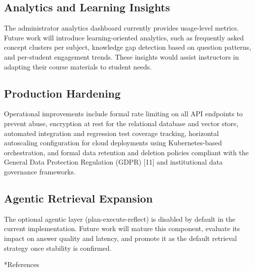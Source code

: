 \documentclass[12pt, a4paper, oneside]{report}
\makeatletter
\newcommand{\chapformat}[1]{%
  \centering
  {\fontsize{14}{17}\selectfont\itshape\addfontfeatures{LetterSpace=3.5}%
    \MakeUppercase{\chaptertitlename}\ \thechapter}\\[24pt]%
  {\fontsize{16}{19}\selectfont\bfseries\addfontfeatures{LetterSpace=0}%
    \MakeUppercase{#1}}%
}
\newcommand{\chapformatstar}[1]{%
  \centering
  {\fontsize{16}{19}\selectfont\bfseries\MakeUppercase{#1}}%
}
\newcommand{\chapterstar}[1]{%
  \clearpage
  \phantomsection
  \edef\@saved@chapcount{\the\value{chapter}}%
  \titleformat{\chapter}[block]{}{}%
    {0pt}{\chapformatstar}%
  \@originalchapter*{#1}%
  \setcounter{chapter}{\@saved@chapcount}%
  \titleformat{\chapter}[block]{}{}%
    {0pt}{\chapformat}%
}
\let\@originalchapter\chapter
\renewcommand{\chapter}{%
  \@ifstar{\chapterstar}{\@originalchapter}%
}
\let\oldsubsection\subsection
\renewcommand{\subsection}{%
  \addtocontents{toc}{\protect\needspace{3\baselineskip}}%
  \oldsubsection
}
\makeatother
\begin{document}
\subsection{Analytics and Learning Insights}

The administrator analytics dashboard currently provides usage-level metrics. Future work will introduce learning-oriented analytics, such as frequently asked concept clusters per subject, knowledge gap detection based on question patterns, and per-student engagement trends. These insights would assist instructors in adapting their course materials to student needs.

\subsection{Production Hardening}

Operational improvements include formal rate limiting on all API endpoints to prevent abuse, encryption at rest for the relational database and vector store, automated integration and regression test coverage tracking, horizontal autoscaling configuration for cloud deployments using Kubernetes-based orchestration, and formal data retention and deletion policies compliant with the General Data Protection Regulation (GDPR) [11] and institutional data governance frameworks.

\subsection{Agentic Retrieval Expansion}

The optional agentic layer (plan-execute-reflect) is disabled by default in the current implementation. Future work will mature this component, evaluate its impact on answer quality and latency, and promote it as the default retrieval strategy once stability is confirmed.

\chapter*{References}
\end{document}
